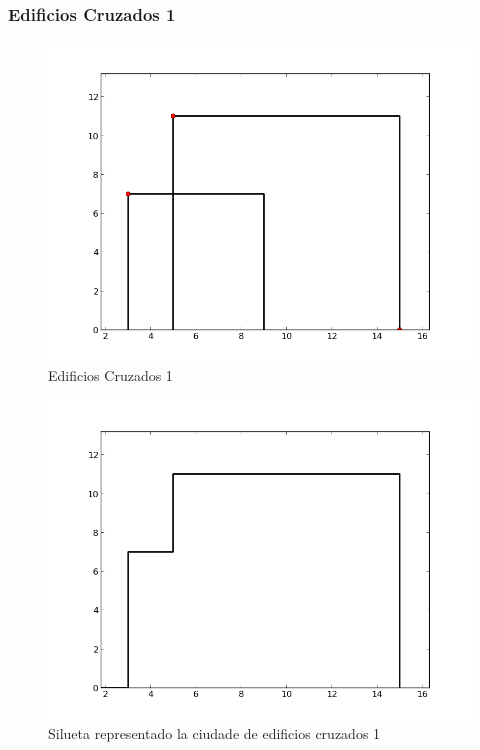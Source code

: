 \subsubsection*{Edificios Cruzados 1}
\begin{figure}[H]
\begin{center}
\includegraphics[scale=0.5]{./imagenes/ej2_edificio2.png}
\caption{Edificios Cruzados 1}
\end{center}
\end{figure}
\begin{figure}[H]
\begin{center}
\includegraphics[scale=0.5]{./imagenes/ej2_edificio2solucion.png}
\caption{Silueta representado la ciudade de edificios cruzados 1}
\end{center}
\end{figure}

